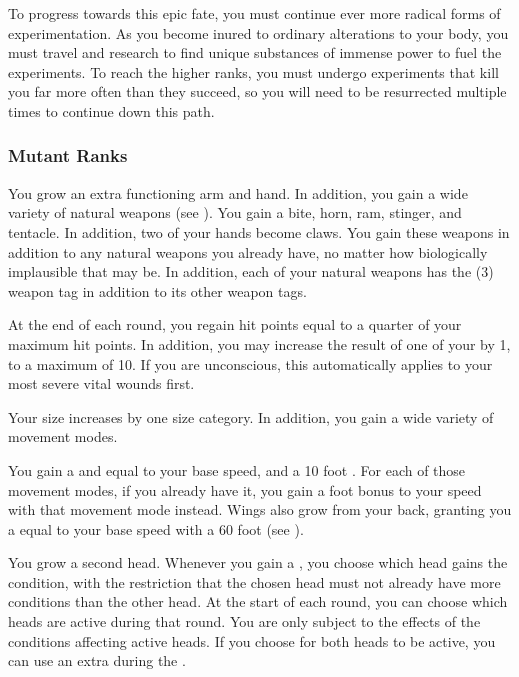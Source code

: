          To progress towards this epic fate, you must continue ever more radical forms of experimentation.
        As you become inured to ordinary alterations to your body, you must travel and research to find unique substances of immense power to fuel the experiments.
        To reach the higher ranks, you must undergo experiments that kill you far more often than they succeed, so you will need to be resurrected multiple times to continue down this path.

        \subsubsection{Mutant Ranks}
             You grow an extra functioning arm and hand.
            In addition, you gain a wide variety of natural weapons (see ).
            You gain a bite, horn, ram, stinger, and tentacle.
            In addition, two of your hands become claws.
            You gain these weapons in addition to any natural weapons you already have, no matter how biologically implausible that may be.
            In addition, each of your natural weapons has the  (3) weapon tag in addition to its other weapon tags.

             At the end of each round, you regain hit points equal to a quarter of your maximum hit points.
            In addition, you may increase the result of one of your  by 1, to a maximum of 10.
            If you are unconscious, this automatically applies to your most severe vital wounds first.

             Your size increases by one size category.
            In addition, you gain a wide variety of movement modes.

            You gain a  and  equal to your base speed, and a 10 foot .
            For each of those movement modes, if you already have it, you gain a  foot bonus to your speed with that movement mode instead.
            Wings also grow from your back, granting you a  equal to your base speed with a 60 foot  (see ).

             You grow a second head.
            Whenever you gain a , you choose which head gains the condition, with the restriction that the chosen head must not already have more conditions than the other head.
            At the start of each round, you can choose which heads are active during that round.
            You are only subject to the effects of the conditions affecting active heads.
            If you choose for both heads to be active, you can use an extra  during the .

